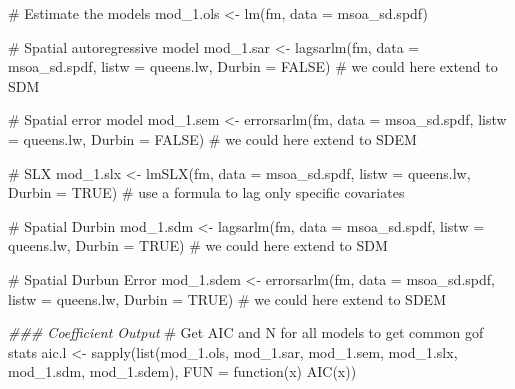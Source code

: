 \documentclass[
  letterpaper,
  DIV=11,
  numbers=noendperiod]{scrreprt}
\newenvironment{Shaded}{\begin{snugshade}}{\end{snugshade}}
\newcommand{\AttributeTok}[1]{\textcolor[rgb]{0.40,0.45,0.13}{#1}}
\newcommand{\CommentTok}[1]{\textcolor[rgb]{0.37,0.37,0.37}{#1}}
\newcommand{\ConstantTok}[1]{\textcolor[rgb]{0.56,0.35,0.01}{#1}}
\newcommand{\ControlFlowTok}[1]{\textcolor[rgb]{0.00,0.23,0.31}{#1}}
\newcommand{\DocumentationTok}[1]{\textcolor[rgb]{0.37,0.37,0.37}{\textit{#1}}}
\newcommand{\FunctionTok}[1]{\textcolor[rgb]{0.28,0.35,0.67}{#1}}
\newcommand{\NormalTok}[1]{\textcolor[rgb]{0.00,0.23,0.31}{#1}}
\newcommand{\OtherTok}[1]{\textcolor[rgb]{0.00,0.23,0.31}{#1}}
\begin{document}
\begin{Shaded}
\begin{Highlighting}[]
\CommentTok{\# Estimate the models}
\NormalTok{mod\_1.ols }\OtherTok{\textless{}{-}} \FunctionTok{lm}\NormalTok{(fm, }\AttributeTok{data =}\NormalTok{ msoa\_sd.spdf)}

\CommentTok{\# Spatial autoregressive model}
\NormalTok{mod\_1.sar }\OtherTok{\textless{}{-}} \FunctionTok{lagsarlm}\NormalTok{(fm,  }
                      \AttributeTok{data =}\NormalTok{ msoa\_sd.spdf, }
                      \AttributeTok{listw =}\NormalTok{ queens.lw,}
                      \AttributeTok{Durbin =} \ConstantTok{FALSE}\NormalTok{) }\CommentTok{\# we could here extend to SDM}

\CommentTok{\# Spatial error model}
\NormalTok{mod\_1.sem }\OtherTok{\textless{}{-}} \FunctionTok{errorsarlm}\NormalTok{(fm,  }
                        \AttributeTok{data =}\NormalTok{ msoa\_sd.spdf, }
                        \AttributeTok{listw =}\NormalTok{ queens.lw,}
                        \AttributeTok{Durbin =} \ConstantTok{FALSE}\NormalTok{) }\CommentTok{\# we could here extend to SDEM}

\CommentTok{\# SLX}
\NormalTok{mod\_1.slx }\OtherTok{\textless{}{-}} \FunctionTok{lmSLX}\NormalTok{(fm,  }
                   \AttributeTok{data =}\NormalTok{ msoa\_sd.spdf, }
                   \AttributeTok{listw =}\NormalTok{ queens.lw, }
                   \AttributeTok{Durbin =} \ConstantTok{TRUE}\NormalTok{) }\CommentTok{\# use a formula to lag only specific covariates}

\CommentTok{\# Spatial Durbin}
\NormalTok{mod\_1.sdm }\OtherTok{\textless{}{-}} \FunctionTok{lagsarlm}\NormalTok{(fm,  }
                      \AttributeTok{data =}\NormalTok{ msoa\_sd.spdf, }
                      \AttributeTok{listw =}\NormalTok{ queens.lw,}
                      \AttributeTok{Durbin =} \ConstantTok{TRUE}\NormalTok{) }\CommentTok{\# we could here extend to SDM}

\CommentTok{\# Spatial Durbun Error}
\NormalTok{mod\_1.sdem }\OtherTok{\textless{}{-}} \FunctionTok{errorsarlm}\NormalTok{(fm,  }
                        \AttributeTok{data =}\NormalTok{ msoa\_sd.spdf, }
                        \AttributeTok{listw =}\NormalTok{ queens.lw,}
                        \AttributeTok{Durbin =} \ConstantTok{TRUE}\NormalTok{) }\CommentTok{\# we could here extend to SDEM}


\DocumentationTok{\#\#\# Coefficient Output}
\CommentTok{\# Get AIC and N for all models to get common gof stats}
\NormalTok{aic.l }\OtherTok{\textless{}{-}} \FunctionTok{sapply}\NormalTok{(}\FunctionTok{list}\NormalTok{(mod\_1.ols, mod\_1.sar, mod\_1.sem, mod\_1.slx, mod\_1.sdm, mod\_1.sdem),}
       \AttributeTok{FUN =} \ControlFlowTok{function}\NormalTok{(x) }\FunctionTok{AIC}\NormalTok{(x))}


\end{Highlighting}
\end{Shaded}
\end{document}
